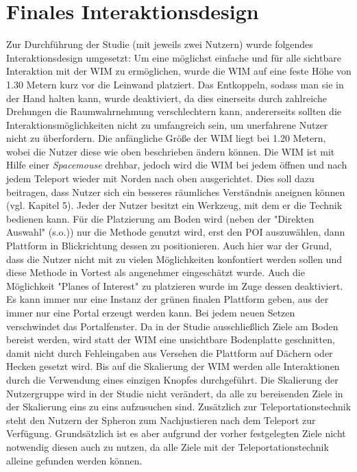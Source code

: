 \section{Finales Interaktionsdesign}
Zur Durchführung der Studie (mit jeweils zwei Nutzern) wurde folgendes Interaktionsdesign umgesetzt:
Um eine möglichst einfache und für alle sichtbare Interaktion mit der WIM zu ermöglichen, wurde die WIM auf eine feste Höhe von 1.30 Metern kurz vor die Leinwand platziert. Das Entkoppeln, sodass man sie in der Hand halten kann, wurde deaktiviert, da dies einerseits durch zahlreiche Drehungen die Raumwahrnehmung verschlechtern kann, andererseits sollten die Interaktionsmöglichkeiten nicht zu umfangreich sein, um unerfahrene Nutzer nicht zu überfordern. Die anfängliche Größe der WIM liegt bei 1.20 Metern, wobei die Nutzer diese wie oben beschrieben ändern können.
Die WIM ist mit Hilfe einer \textit{Spacemouse} drehbar, jedoch wird die WIM bei jedem öffnen und nach jedem Teleport wieder mit Norden nach oben ausgerichtet.
Dies soll dazu beitragen, dass Nutzer sich ein besseres räumliches Verständnis aneignen können (vgl. Kapitel 5).
Jeder der Nutzer besitzt ein Werkzeug, mit dem er die Technik bedienen kann. 
Für die Platzierung am Boden wird (neben der "Direkten Auswahl" (s.o.)) nur die Methode genutzt wird, erst den POI auszuwählen, dann Plattform in Blickrichtung dessen zu positionieren. Auch hier war der Grund, dass die Nutzer nicht mit zu vielen Möglichkeiten konfontiert werden sollen und diese Methode in Vortest als angenehmer eingeschätzt wurde.
Auch die Möglichkeit "Planes of Interest" zu platzieren wurde im Zuge dessen deaktiviert. Es kann immer nur eine Instanz der grünen finalen Plattform geben, aus der immer nur eine Portal erzeugt werden kann.
Bei jedem neuen Setzen verschwindet das Portalfenster.
Da in der Studie ausschließlich Ziele am Boden bereist werden, wird statt der WIM eine unsichtbare Bodenplatte geschnitten, damit nicht durch Fehleingaben aus Versehen die Plattform auf Dächern oder Hecken gesetzt wird.
Bis auf die Skalierung der WIM werden alle Interaktionen durch die Verwendung eines einzigen Knopfes durchgeführt.
Die Skalierung der Nutzergruppe wird in der Studie nicht verändert, da alle zu bereisenden Ziele in der Skalierung eins zu eins aufzusuchen sind.
Zusätzlich zur Teleportationstechnik steht den Nutzern der Spheron zum Nachjustieren nach dem Teleport zur Verfügung. Grundsätzlich ist es aber aufgrund der vorher festgelegten Ziele nicht notwendig diesen auch zu nutzen, da alle Ziele mit der Teleportationstechnik alleine gefunden werden können.